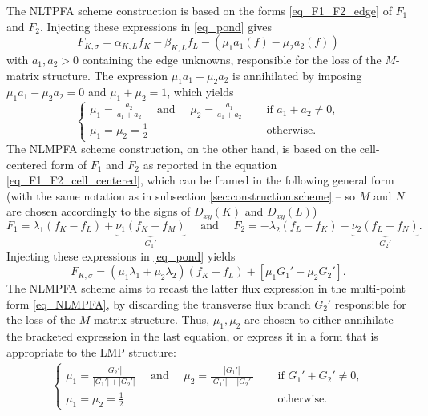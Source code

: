 \documentclass[final,11pt]{elsarticle}
\begin{document}
The NLTPFA scheme construction is based on the forms \eqref{eq_F1_F2_edge} of $F_1$ and $F_2$. Injecting these expressions in \eqref{eq_pond} gives
\begin{equation}
    F_{K,\sigma}=\alpha_{K,L}f_K-\beta_{K,L}f_{L}-(\mu_1a_1(f)-\mu_2a_2(f))
\end{equation}
with $a_1,a_2>0$ containing the edge unknowns, responsible for the loss of the $M$-matrix structure. The expression $\mu_1a_1-\mu_2a_2$ is annihilated by imposing $\mu_1a_1-\mu_2a_2=0$ and $\mu_1+\mu_2=1$, which yields
\begin{equation*}
    \left\{\begin{array}{ll}
    \mu_1=\frac{a_2}{a_1+a_2}\quad\mbox{ and }\quad \mu_2=\frac{a_1}{a_1+a_2}& \quad \text{ if }a_1+a_2\neq 0,\\
    \mu_1=\mu_2=\frac12&\quad\text{ otherwise}.
    \end{array}\right.
\end{equation*}
The NLMPFA scheme construction, on the other hand, is based on the cell-centered form of $F_1$ and $F_2$ as reported in the equation \eqref{eq_F1_F2_cell_centered}, which can be framed in the following general form (with the same notation as in subsection \ref{sec:construction.scheme} -- so $M$ and $N$ are chosen accordingly to the signs of $D_{xy}(K)$ and $D_{xy}(L)$)
\begin{equation*}
    F_1=\lambda_1(f_K-f_L)+\underbrace{\nu_1(f_K-f_M)}_{G_1'}\quad\mbox{ and }\quad
    F_2=-\lambda_2(f_L-f_K)-\underbrace{\nu_2(f_L-f_N)}_{G_2'}.
\end{equation*}
Injecting these expressions in \eqref{eq_pond} yields
\begin{equation}
    F_{K,\sigma}=(\mu_1\lambda_1+\mu_2\lambda_2)(f_K-f_L)+[\mu_1G_1'-\mu_2G_2'].
    \label{eq_NLMPFA_G1_G2}
\end{equation}
The NLMPFA scheme aims to recast the latter flux expression in the multi-point form \eqref{eq_NLMPFA}, by discarding the transverse flux branch $G_2'$ responsible for the loss of the $M$-matrix structure. Thus, $\mu_1,\mu_2$ are chosen to either annihilate the bracketed expression in the last equation, or express it in a form that is appropriate to the LMP structure:
\begin{equation*}
    \begin{gathered}
    \left\{\begin{array}{ll}
    \mu_1=\frac{|G_2'|}{|G_1'|+|G_2'|}\quad\mbox{ and }\quad \mu_2=\frac{|G_1'|}{|G_1'|+|G_2'|} & \quad\mbox{ if }G_1'+G_2'\neq 0,\\[.7em]
    \mu_1=\mu_2=\frac12&\quad\text{ otherwise}.
    \end{array}\right.
    \end{gathered}
\end{equation*}
\end{document}
